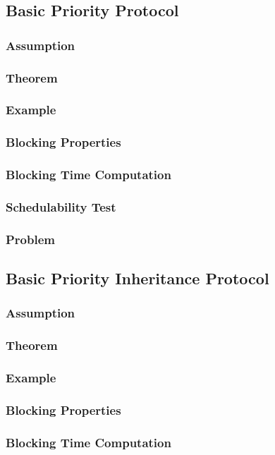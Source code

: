 \subsection{Basic Priority Protocol}
\subsubsection{Assumption}
\subsubsection{Theorem}
\subsubsection{Example}
\subsubsection{Blocking Properties}
\subsubsection{Blocking Time Computation}
\subsubsection{Schedulability Test}
\subsubsection{Problem}

\subsection{Basic Priority Inheritance Protocol}
\subsubsection{Assumption}
\subsubsection{Theorem}
\subsubsection{Example}
\subsubsection{Blocking Properties}
\subsubsection{Blocking Time Computation}

